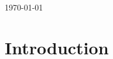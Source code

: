 \documentclass[a4paper,12pt]{article}
\begin{document}
\begin{titlepage}

{\large \today}\\[3cm] %

 

\vfill %

\end{titlepage}

\newpage


\tableofcontents

\newpage

\section{Introduction}
\end{document}
